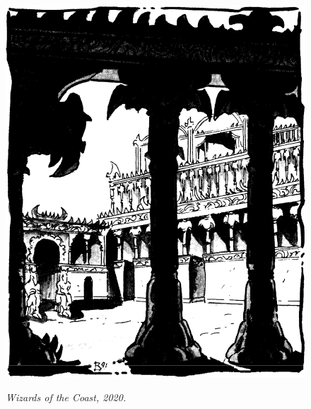 \begin{figure}[b!]
\centering
\includegraphics[width=\columnwidth]{images/nibenay-1.png}
\par\textit{\small\textcopyright Wizards of the Coast, 2020.}
\end{figure}

